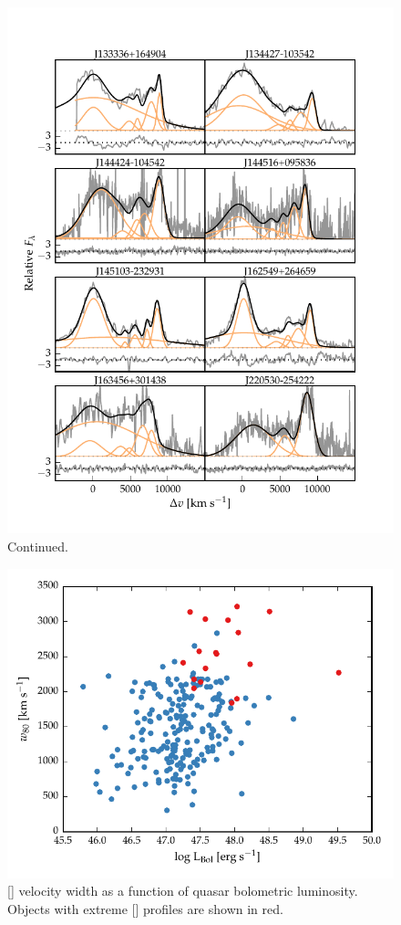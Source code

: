\begin{figure}
\ContinuedFloat
    \centering
    \includegraphics[width=\columnwidth]{figures/chapter04/example_spectrum_grid_extreme_oiii_2.pdf} 
    \caption{Continued.}     
    \label{fig:example_spectrum_grid_extreme_oiii_2}
\end{figure}


\begin{figure}
    \centering
    \includegraphics[width=\columnwidth]{figures/chapter04/lum_w80.pdf} 
    \caption[{}]{[] velocity width as a function of quasar bolometric luminosity. Objects with extreme [] profiles are shown in red.}     
    \label{fig:lum_w80}
\end{figure}

